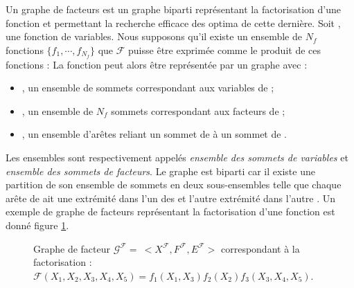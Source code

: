 Un graphe de facteurs est un graphe biparti représentant la factorisation d'une fonction et permettant la recherche efficace des optima de cette dernière. Soit , une fonction de  variables. Nous supposons qu'il existe un ensemble de $N_{f}$ fonctions $\lbrace f_{1}, \cdots, f_{N_{f}} \rbrace$  que $\mathcal{F}$ puisse être exprimée comme le produit de ces fonctions :
La fonction  peut alors être représentée par un graphe  avec :
\begin{itemize}
\item {}, un ensemble de  sommets correspondant aux variables de  ;
\item {}, un ensemble de $N_{f}$ sommets correspondant aux facteurs de ;
\item {}, un ensemble d'arêtes reliant un sommet de  à un sommet de .
\end{itemize}

Les ensembles  sont respectivement appelés \emph{ensemble des sommets de variables} et \emph{ensemble des sommets de facteurs}. Le graphe  est biparti car il existe une partition de son ensemble de sommets en deux sous-ensembles telle que chaque arête de  ait une extrémité dans l'un des  et l'autre extrémité dans l'autre . Un exemple de graphe de facteurs représentant la factorisation d'une fonction est donné  figure \ref{fig:saf:gfEx}.
\begin{figure}[htbp]
\begin{center}
\scalebox{.7}{

}
\caption{Graphe de facteur $\mathcal{G}^{\mathcal{F}}=\ <X^{\mathcal{F}},F^{\mathcal{F}},E^{\mathcal{F}}>$ correspondant à la factorisation :\\ $\mathcal{F}(X_{1},X_{2},X_{3},X_{4},X_{5}) = f_{1}(X_{1},X_{3}) f_{2}(X_{2}) f_{3}(X_{3},X_{4},X_{5})$.}
\label{fig:saf:gfEx}
\end{center}
\end{figure}

